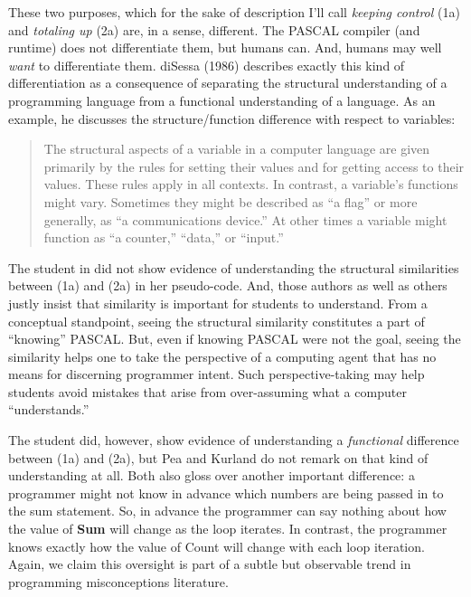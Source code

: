 These two purposes, which for the sake of description I'll call
\emph{keeping control} (1a) and \emph{totaling up} (2a) are, in a sense,
different. The PASCAL compiler (and runtime) does not differentiate
them, but humans can. And, humans may well \emph{want} to differentiate
them. diSessa (1986) describes exactly this kind of differentiation as a
consequence of separating the structural understanding of a programming
language from a functional understanding of a language. As an example,
he discusses the structure/function difference with respect to
variables:

\begin{quote}
  The structural aspects of a variable in a computer language are given
  primarily by the rules for setting their values and for getting access
  to their values. These rules apply in all contexts. In contrast, a
  variable's functions might vary. Sometimes they might be described as
  ``a flag'' or more generally, as ``a communications device.'' At other
  times a variable might function as ``a counter,'' ``data,'' or
  ``input.'' \cite{disessa_models_1986}
\end{quote}

The student in \cite{bonar_uncovering_1983} did not show evidence of
understanding the structural similarities between (1a) and (2a) in her
pseudo-code. And, those authors as well as others \cite{pea_cognitive_1983} justly insist that
similarity is important for students to understand. From a conceptual
standpoint, seeing the structural similarity constitutes a part of
``knowing'' PASCAL. But, even if knowing PASCAL were not the goal,
seeing the similarity helps one to take the perspective of a computing
agent that has no means for discerning programmer intent. Such
perspective-taking may help students avoid mistakes that arise from
over-assuming what a computer ``understands.''

The student did, however, show evidence of understanding a \emph{functional} \cite{disessa_models_1986} difference
between (1a) and (2a), but Pea and Kurland do not remark on that kind of
understanding at all. Both \cite{pea_cognitive_1983,bonar_uncovering_1983} also gloss over another
important difference: a programmer might not know in advance which
numbers are being passed in to the sum statement. So, in advance the
programmer can say nothing about how the value of \textbf{Sum} will
change as the loop iterates. In contrast, the programmer knows exactly
how the value of Count will change with each loop iteration. Again, we
claim this oversight is part of a subtle but observable trend in
programming misconceptions literature.

